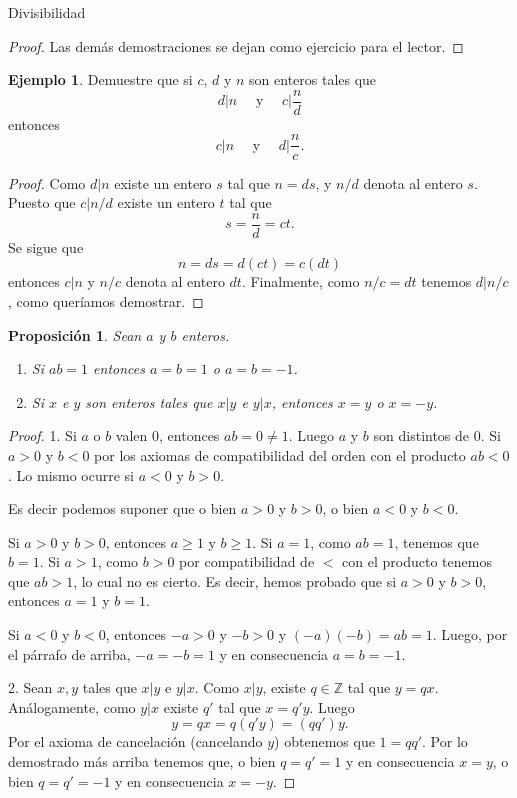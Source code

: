 \documentclass[11pt,spanish,makeidx]{amsbook}
\newtheorem{proposicion}[teorema]{Proposici\'on}
\theoremstyle{definition}
\newtheorem{ejemplo}{Ejemplo}[section]
\theoremstyle{remark}
\begin{document}
\begin{section}{Divisibilidad}
\begin{proof}
	Las demás demostraciones se dejan como ejercicio para el lector. 

\end{proof}

\begin{ejemplo} Demuestre que si $c$, $d$ y $n$ son enteros tales
que
$$
d|n \quad\text{ y }\quad c|\frac{n}{d}
$$
entonces
$$
c|n \quad\text{ y }\quad d|\frac{n}{c}.
$$
\end{ejemplo}
\begin{proof} Como $d|n$ existe un entero $s$ tal que $n=ds$, y $n/d$ denota al entero $s$. Puesto que $c|n/d$ existe un entero $t$ tal que
$$
s=\frac{n}{d} =ct.
$$
Se sigue que
$$
n=ds=d(ct)=c(dt)
$$
entonces $c|n$ y $n/c$ denota al entero $dt$. Finalmente, como $n/c=dt$ tenemos $d|n/c$, como queríamos demostrar.
\end{proof}

\begin{proposicion}\label{pm} Sean $a$ y $b$ enteros.
\begin{enumerate}
\item Si  $ab=1$ entonces $a=b=1$ o $a=b=-1$. 
\item Si $x$ e $y$ son enteros tales que $x|y$ e $y|x$, entonces $x=y$ o $x=-y$.
\end{enumerate}
\end{proposicion}
\begin{proof} 1. Si $a$ o $b$ valen 0, entonces $ab=0 \not=1$. Luego $a$ y $b$ son distintos de 0. Si $a>0$ y $b<0$ por los axiomas de compatibilidad del orden con el producto $ab<0$. Lo mismo ocurre si $a<0$ y $b>0$.

Es decir podemos suponer que o bien $a>0$ y $b>0$, o bien $a<0$ y $b<0$. 

Si  $a>0$ y $b>0$, entonces  $a\ge 1$ y $b\ge 1$. Si $a=1$, como $ab =1$, tenemos que $b = 1$. Si $a>1$, como  $b>0$ por compatibilidad de $<$ con el producto tenemos que $ab>1$, lo cual no es cierto. Es decir, hemos probado que si  $a>0$ y $b>0$, entonces $a=1$ y $b=1$.

Si  $a<0$ y $b<0$, entonces   $-a>0$ y $-b>0$ y $(-a)(-b) = ab =1$. Luego, por el párrafo de arriba, $-a=-b=1$ y en consecuencia $a=b=-1$.

\vskip 0.1cm

2. Sean $x,y$ tales que  $x|y$ e $y|x$. Como $x|y$, existe $q \in \mathbb Z$ tal que $y = qx$. Análogamente, como $y|x$ existe $q'$ tal que $x = q'y$. Luego
$$
y = qx = q(q'y) = (qq')y.
$$
Por el axioma de cancelación (cancelando $y$) obtenemos que $1 = qq'$. Por lo demostrado más arriba tenemos que, o bien $q=q'=1$ y en consecuencia $x=y$, o bien $q=q'=-1$ y en consecuencia $x=-y$. 
\end{proof}


\end{section}
\end{document}
